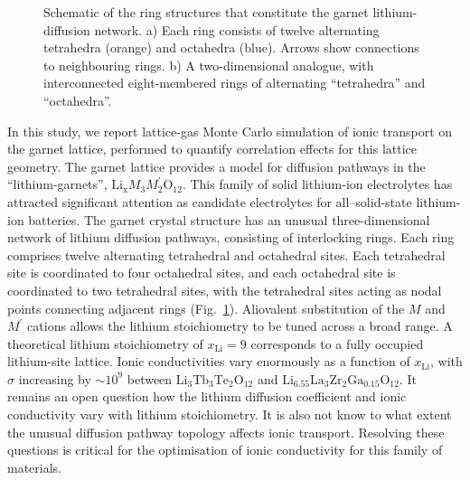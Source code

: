 \documentclass[aps,prb,twocolumn,superscriptaddress,reprint]{revtex4-1}
\newcommand{\xLi}{x_\m{Li}}
\newcommand{\m}[1]{\mathrm{#1}}
\newcommand{\chem}[1]{\ensuremath{\mathrm{#1}}}
\begin{document}
\begin{figure}[tb]
  \centering
    \caption{\label{fig:garnet_network_schematic}Schematic of the ring structures that constitute the garnet lithium-diffusion network. a) Each ring consists of twelve alternating tetrahedra (orange) and octahedra (blue). 
Arrows show connections to neighbouring rings.\cite{AwakaEtAl_ChemLett2011} b) A two-dimensional analogue, with interconnected eight-membered rings of alternating ``tetrahedra'' and ``octahedra''.}
\end{figure}

In this study, we report lattice-gas Monte Carlo simulation of ionic transport on the garnet lattice, performed to quantify correlation effects for this lattice geometry. The garnet lattice provides a model for diffusion pathways in the ``lithium-garnets'', $\m{Li}_\m{x}M_3M^\prime_2\m{O}_{12}$.\cite{ThangaduraiEtAl_JAmCeramSoc2003, ThangaduraiEtAl_JPhysChemLett2015} This family of solid lithium-ion electrolytes has attracted significant attention as candidate electrolytes for all--solid-state lithium-ion batteries.\cite{BachmanEtAl_ChemRev2016, InadaEtAl_FrontEnergyRes2016,HanEtAl_NatMater2016, RamakumarEtAl_ProgMaterSci2017} The garnet crystal structure has an unusual three-dimensional network of lithium diffusion pathways, consisting of interlocking rings.\cite{AwakaEtAl_ChemLett2011} Each ring comprises twelve alternating tetrahedral and octahedral sites. Each tetrahedral site is coordinated to four octahedral sites, and each octahedral site is coordinated to two tetrahedral sites, with the tetrahedral sites acting as nodal points connecting adjacent rings (Fig.~\ref{fig:garnet_network_schematic}).
Aliovalent substitution of the $M$ and $M^\prime$ cations allows the lithium stoichiometry to be tuned across a broad range. 
A theoretical lithium stoichiometry of $\xLi=9$ corresponds to a fully occupied lithium-site lattice. 
Ionic conductivities vary enormously as a function of $\xLi$, with $\sigma$ increasing by $\sim\!10^9$ between \chem{Li_3Tb_3Te_2O_{12}} and \chem{Li_{6.55}La_3Zr_2Ga_{0.15}O_{12}}.\cite{ThangaduraiEtAl_JPhysChemLett2015, BachmanEtAl_ChemRev2016} It remains an open question how the lithium diffusion coefficient and ionic conductivity vary with lithium stoichiometry. It is also not know to what extent the unusual diffusion pathway topology affects ionic transport. Resolving these questions is critical for the optimisation of ionic conductivity for this family of materials.
\end{document}
